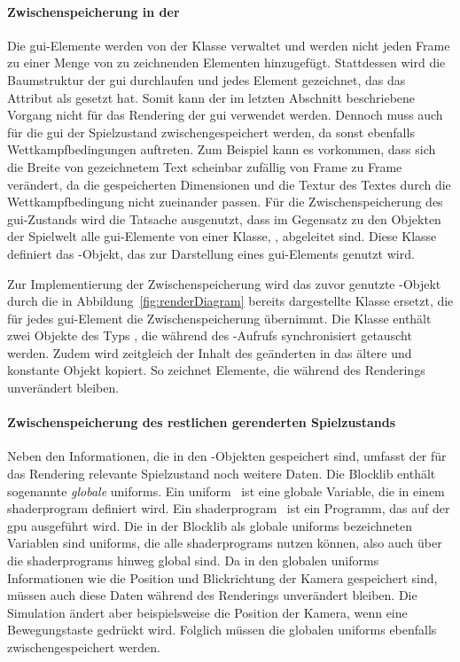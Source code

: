 \paragraph{Zwischenspeicherung in der }
Die \ac{gui}-Elemente werden von der Klasse \classUIRenderer{} verwaltet und werden nicht jeden Frame zu einer Menge von zu zeichnenden Elementen hinzugefügt. 
Stattdessen wird die Baumstruktur der \ac{gui} durchlaufen und jedes Element gezeichnet, das das Attribut  als  gesetzt hat. Somit kann der im letzten Abschnitt beschriebene Vorgang nicht für das Rendering der \ac{gui} verwendet werden. Dennoch muss auch für die \ac{gui} der Spielzustand zwischengespeichert werden, da sonst ebenfalls Wettkampfbedingungen auftreten. Zum Beispiel kann es vorkommen, dass sich die Breite von gezeichnetem Text scheinbar zufällig von Frame zu Frame verändert, da die gespeicherten Dimensionen und die Textur des Textes durch die Wettkampfbedingung nicht zueinander passen. Für die Zwischenspeicherung des \ac{gui}-Zustands wird die Tatsache ausgenutzt, dass im Gegensatz zu den Objekten der Spielwelt alle \ac{gui}-Elemente von einer Klasse, \classUIItem{}, abgeleitet sind. Diese Klasse definiert das \classRenderable{}-Objekt, das zur Darstellung eines \ac{gui}-Elements genutzt wird. 

Zur Implementierung der Zwischenspeicherung wird das zuvor genutzte \classUIRenderable{}-Objekt durch die in Abbildung~\ref{fig:renderDiagram} bereits dargestellte Klasse \classDoubleBufferedUIRenderable{} ersetzt, die für jedes \ac{gui}-Element die Zwischenspeicherung übernimmt. Die Klasse enthält zwei Objekte des Typs \classUIRenderable{}, die während des -Aufrufs synchronisiert getauscht werden. Zudem wird zeitgleich der Inhalt des geänderten \classUIRenderable{} in das ältere und konstante Objekt kopiert. So zeichnet \classUIRenderer{} Elemente, die während des Renderings unverändert bleiben.

\paragraph{Zwischenspeicherung des restlichen gerenderten Spielzustands} Neben den Informationen, die in den  \classRenderable{}-Objekten gespeichert sind, umfasst der für das Rendering relevante Spielzustand noch weitere Daten. 
Die Blocklib enthält sogenannte \emph{globale} \glspl{uniform}. Ein \gls{uniform}~\cite[S.~45~\psqq]{Vries2020} ist eine globale Variable, die in einem \gls{shaderprogram} definiert wird. Ein \gls{shaderprogram}~\cite[S.~32~\psq]{Vries2020} ist ein \gls{Programm}, das auf der \ac{gpu} ausgeführt wird. Die in der Blocklib als globale \glspl{uniform} bezeichneten Variablen sind \glspl{uniform}, die alle \glspl{shaderprogram} nutzen können, also auch über die \glspl{shaderprogram} hinweg global sind. Da in den globalen \glspl{uniform} Informationen wie die Position und Blickrichtung der Kamera gespeichert sind, müssen auch diese Daten während des Renderings unverändert bleiben. Die Simulation ändert aber beispielsweise die Position der Kamera, wenn eine Bewegungstaste gedrückt wird. Folglich müssen die globalen \glspl{uniform} ebenfalls zwischengespeichert werden.

